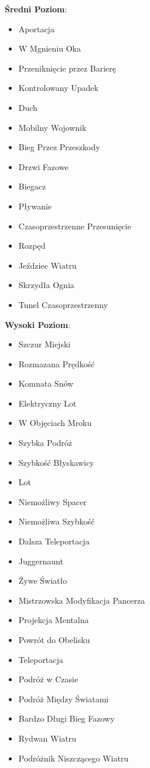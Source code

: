 \textbf{Średni Poziom}:

\begin{itemize}
\item Aportacja
\item W Mgnieniu Oka
\item Przeniknięcie przez Barierę
\item Kontrolowany Upadek
\item Duch
\item Mobilny Wojownik
\item Bieg Przez Przeszkody
\item Drzwi Fazowe
\item Biegacz
\item Pływanie
\item Czasoprzestrzenne Przesunięcie
\item Rozpęd
\item Jeździec Wiatru
\item Skrzydła Ognia
\item Tunel Czasoprzestrzenny
\end{itemize}

\textbf{Wysoki Poziom}:

\begin{itemize}
\item Szczur Miejski
\item Rozmazana Prędkość
\item Komnata Snów
\item Elektryczny Lot
\item W Objęciach Mroku
\item Szybka Podróż
\item Szybkość Błyskawicy
\item Lot
\item Niemożliwy Spacer
\item Niemożliwa Szybkość
\item Dalsza Teleportacja
\item Juggernaunt
\item Żywe Światło
\item Mistrzowska Modyfikacja Pancerza
\item Projekcja Mentalna
\item Powrót do Obelisku
\item Teleportacja
\item Podróż w Czasie
\item Podróż Między Światami
\item Bardzo Długi Bieg Fazowy
\item Rydwan Wiatru
\item Podróżnik Niszczącego Wiatru
\end{itemize}

